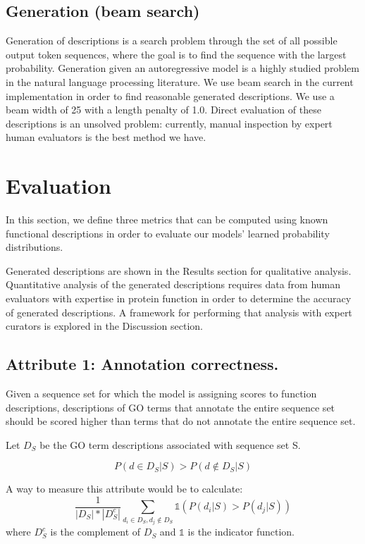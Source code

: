 \documentclass{article}
\begin{document}
    \subsection{Generation (beam search)}
    Generation of descriptions is a search problem through the set of all possible output token sequences, where the goal is to find the sequence with the largest probability. Generation given an autoregressive model is a highly studied problem in the natural language processing literature.
    We use beam search \cite{graves2012sequence} in the current implementation in order to find reasonable generated descriptions. We use a beam width of 25 with a length penalty of 1.0. Direct evaluation of these descriptions is an unsolved problem: currently, manual inspection by expert human evaluators is the best method we have.

\section{Evaluation}
In this section, we define three metrics that can be computed using known functional descriptions in order to evaluate our models' learned probability distributions.

Generated descriptions are shown in the Results section for qualitative analysis.
Quantitative analysis of the generated descriptions requires data from human evaluators with expertise in protein function in order to determine the accuracy of generated descriptions.
A framework for performing that analysis with expert curators is explored in the Discussion section.
        \subsection{Attribute 1: Annotation correctness.}

        Given a sequence set for which the model is assigning scores to function descriptions, descriptions of GO terms that annotate the entire sequence set should be scored higher than terms that do not annotate the entire sequence set.

        Let $D_{S}$ be the GO term descriptions associated with sequence set S.

        \[P(d \in D_{S} | S) > P(d \notin D_{S} | S)\]

        A way to measure this attribute would be to calculate:
        \[\frac{1}{|D_{S}|*|D_{S}^{c}|}\sum_{d_i \in D_{S}, d_j \notin D_{S}} \mathds{1}(P(d_i | S) > P(d_j | S))\]
        where $D_{S}^{c}$ is the complement of $D_{S}$ and $\mathds{1}$ is the indicator function.
\end{document}
